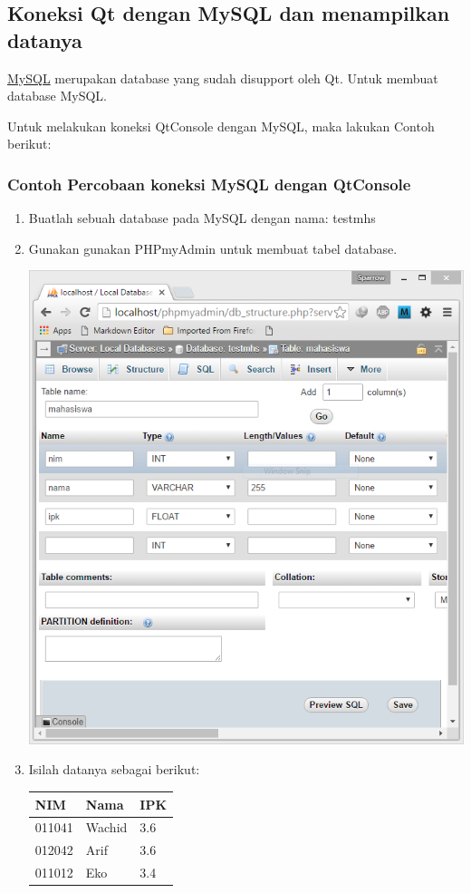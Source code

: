 \subsection{Koneksi Qt dengan MySQL dan menampilkan
datanya}\label{koneksi-qt-dengan-mysql-dan-menampilkan-datanya}

\href{https://www.mysql.com/}{MySQL} merupakan database yang sudah
disupport oleh Qt. Untuk membuat database MySQL.

Untuk melakukan koneksi QtConsole dengan MySQL, maka lakukan Contoh
berikut:

\subsubsection*{Contoh Percobaan koneksi MySQL dengan QtConsole}

\begin{enumerate}


\item
  Buatlah sebuah database pada MySQL dengan nama: testmhs
\item
  Gunakan gunakan PHPmyAdmin untuk membuat tabel database.
  
  \includegraphics[width=0.7\linewidth]{images/phpmyadmin}
  
\item
  Isilah datanya sebagai berikut:

\begin{longtable}[]{@{}lll@{}}
\toprule
NIM & Nama & IPK\tabularnewline
\midrule
\endhead
011041 & Wachid & 3.6\tabularnewline
012042 & Arif & 3.6\tabularnewline
011012 & Eko & 3.4\tabularnewline
\bottomrule
\end{longtable}


\end{enumerate}

